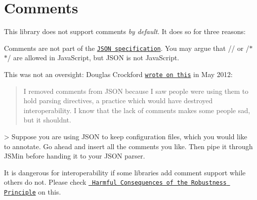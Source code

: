 \chapter{Comments }
\hypertarget{md_include_2nlohman_2json-develop_2docs_2mkdocs_2docs_2features_2comments}{}\label{md_include_2nlohman_2json-develop_2docs_2mkdocs_2docs_2features_2comments}
\label{md_include_2nlohman_2json-develop_2docs_2mkdocs_2docs_2features_2comments_autotoc_md1427}%
%


This library does not support comments {\itshape by default}. It does so for three reasons:\+


\begin{DoxyEnumerate}
\item Comments are not part of the \href{https://tools.ietf.org/html/rfc8259}{\texttt{JSON specification}}. You may argue that {\ttfamily /\+/\+} or {\ttfamily /\+\texorpdfstring{$\ast$}{*} \texorpdfstring{$\ast$}{*}/\+} are allowed in Java\+Script, but JSON is not Java\+Script.
\item This was not an oversight:\+ Douglas Crockford \href{https://plus.google.com/118095276221607585885/posts/RK8qyGVaGSr}{\texttt{wrote on this}} in May 2012:\+
\end{DoxyEnumerate}

\begin{quote}
I removed comments from JSON because I saw people were using them to hold parsing directives, a practice which would have destroyed interoperability. I know that the lack of comments makes some people sad, but it shouldn\textquotesingle{}t. \end{quote}
\begin{DoxyVerb}> Suppose you are using JSON to keep configuration files, which you would like to annotate. Go ahead and insert all the comments you like. Then pipe it through JSMin before handing it to your JSON parser.
\end{DoxyVerb}



\begin{DoxyEnumerate}
\item It is dangerous for interoperability if some libraries add comment support while others do not. Please check \href{https://tools.ietf.org/html/draft-iab-protocol-maintenance-01}{\texttt{ Harmful Consequences of the Robustness Principle}} on this.
\end{DoxyEnumerate}

